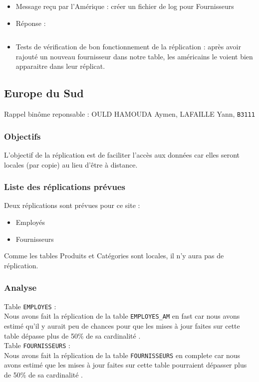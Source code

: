 \documentclass[10pt,a4paper]{article}
\theoremstyle{plain}
\begin{document}
\begin{itemize}
    \item Message reçu par l'Amérique : créer un fichier de log pour Fournisseurs
    \item Réponse : 
    
\inputminted{sql}{INSA-DB12-EuropeNord-rep-eu-n.sql}
    
    \item Tests de vérification de bon fonctionnement de la réplication : après avoir  rajouté un nouveau fournisseur dans notre table, les américains le voient bien apparaitre dans leur réplicat.
\end{itemize}


\newpage

\subsection{Europe du Sud}
Rappel binôme reponsable : OULD HAMOUDA Aymen, LAFAILLE Yann, \verb|B3111|

\subsubsection{Objectifs}
L’objectif de la réplication est de faciliter l’accès aux données car elles seront locales (par copie) au lieu d'être à distance.

\subsubsection{Liste des réplications prévues}
Deux réplications sont prévues pour ce site :
\begin{itemize}
    \item Employés
    \item Fournisseurs
\end{itemize}
Comme les tables Produits et Catégories sont locales, il n'y aura pas de réplication.

\subsubsection{Analyse}
Table \verb|EMPLOYES| :\\
Nous avons fait la réplication de la table \verb|EMPLOYES_AM| en fast  car nous avons estimé qu’il y aurait peu de chances pour que les mises à jour faites sur cette table dépasse plus de 50\% de sa cardinalité .\\

Table \verb|FOURNISSEURS| :\\
Nous avons fait la réplication de la table \verb|FOURNISSEURS| en complete car nous avons estimé que les mises à jour faites sur cette table pourraient dépasser plus de 50\% de sa cardinalité .
\end{document}
